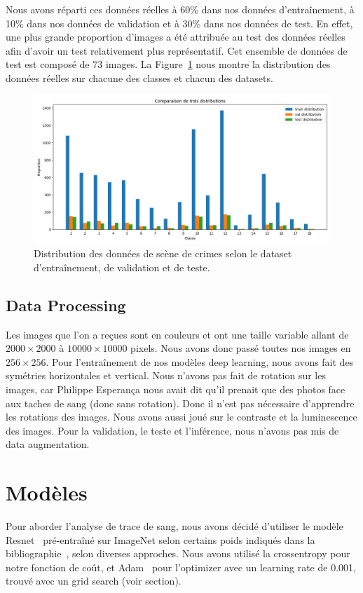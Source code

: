 \documentclass[a4paper]{article}
\begin{document}
Nous avons réparti ces données réelles à 60\% dans nos données d'entraînement, à 10\% dans nos données de validation et à 30\% dans nos données de test. En effet, une plus grande proportion d'images a été attribuée au test des données réelles afin d'avoir un test relativement plus représentatif. Cet ensemble de données de test est composé de 73 images. La Figure~\ref{fig:distribution real} nous montre la distribution des données réelles sur chacune des classes et chacun des datasets.

\begin{figure}[ht]
    \centering
    \includegraphics[width=0.8\linewidth]{../asset/distribution_train_val_test.png}
    \caption{Distribution des données de scène de crimes selon le dataset d'entraînement, de validation et de teste.}
    \label{fig:distribution real}
\end{figure}

\subsection{Data Processing}
Les images que l'on a reçues sont en couleurs et ont une taille variable allant de $2000\times2000$ à $10000\times10000$ pixels. Nous avons donc passé toutes nos images en $256\times256$. Pour l'entraînement de nos modèles deep learning, nous avons fait des symétries horizontales et vertical. Nous n'avons pas fait de rotation sur les images, car Philippe Esperança nous avait dit qu'il prenait que des photos face aux taches de sang (donc sans rotation). Donc il n'est pas nécessaire d'apprendre les rotations des images. Nous avons aussi joué sur le contraste et la luminescence des images. Pour la validation, le teste et l'inférence, nous n'avons pas mis de data augmentation.

\section{Modèles}

Pour aborder l'analyse de trace de sang, nous avons décidé d'utiliser le modèle Resnet~\cite{ResNet} pré-entraîné sur ImageNet selon certains poids indiqués dans la bibliographie~\cite{torchvision}, selon diverses approches. Nous avons utilisé la crossentropy pour notre fonction de coût, et Adam~\cite{adam} pour l'optimizer avec un learning rate de 0.001, trouvé avec un grid search (voir section).
\end{document}
